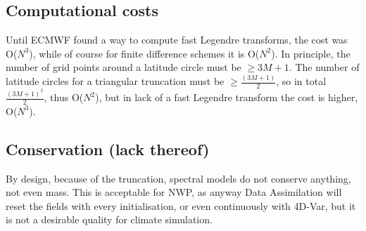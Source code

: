 \subsection{Computational costs}
Until ECMWF found a way to compute fast Legendre transforms, the cost was O($N^3$), while of course for finite difference schemes it is O($N^2$). In principle, the number of grid points around a latitude circle must be $\ge 3M+1$. The number of latitude circles for a triangular truncation must be  $\ge \frac{(3M+1)}{2}$, so in total $\frac{(3M+1)^2}{2}$, thus O($N^2$), but in lack of a fast Legendre transform the cost is higher, O($N^3$).

\subsection{Conservation (lack thereof)}
By design, because of the truncation, spectral models do not conserve anything, not even mass. This is acceptable for NWP, as anyway Data Assimilation will reset the fields with every initialisation, or even continuously with 4D-Var, but it is not a desirable quality for climate simulation.

